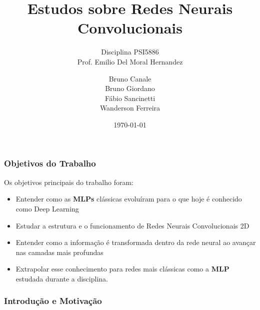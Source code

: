 \documentclass[tikz,10pt]{beamer}
\begin{document}
\author{Bruno Canale \\ Bruno Giordano \\ Fábio Sancinetti \\
  Wanderson Ferreira}
	\title{Estudos sobre Redes Neurais Convolucionais}
	\subtitle{Disciplina PSI5886 \\ Prof. Emilio Del
          Moral Hernandez}
	\date{\today}
        \maketitle
    \begin{frame}
	\frametitle{Objetivos do Trabalho}
	
	Os objetivos principais do trabalho foram:
	
	\begin{itemize}
	    \item Entender como as \textbf{MLPs} clássicas evoluíram para o que hoje é conhecido como Deep Learning
		\item Estudar a estrutura e o funcionamento de Redes Neurais
		Convolucionais 2D
		\item Entender como a informação é transformada dentro da
		rede neural ao avançar nas camadas mais profundas
		\item Extrapolar esse conhecimento para redes mais
		clássicas como a \textbf{MLP} estudada durante a
		disciplina.
	\end{itemize}
	\end{frame}

\begin{frame}
	\frametitle{Introdução e Motivação}
	
\end{frame}
\end{document}
